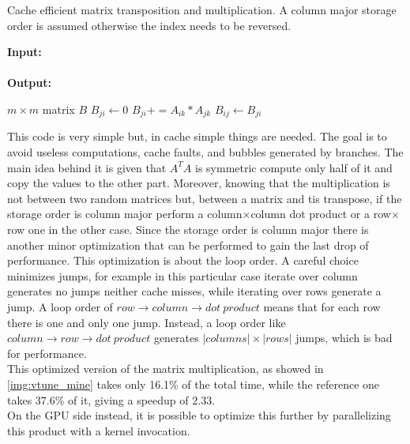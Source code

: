 \begin{algorithm}[h]
  \begin{flushleft}
    \caption{Cache efficient matrix transposition and multiplication. A column major storage order is assumed otherwise the index needs to be reversed.}
    \label{alg:transpose_multiply}
    \textbf{Input:} \\
    \hspace*{\algorithmicindent} \\
    \textbf{Output:} \\
    \hspace*{\algorithmicindent} 
  \end{flushleft}
  \begin{algorithmic}[1]
    \State $m \times m$ matrix $B$
         
        \State $B_{ji} \gets 0$
        \State $B_{ji}+=A_{ik}*A_{jk}$
        \EndFor
        \State $B_{ij} \gets B_{ji}$ 
        \EndFor
        \EndFor
        \EndFunction
      \end{algorithmic}
    \end{algorithm}
This code is very simple but, in cache simple things are needed. The goal is to avoid useless computations, cache faults, and bubbles generated by branches. The main idea behind it is given that $A^TA$ is symmetric compute only half of it and copy the values to the other part. Moreover, knowing that the multiplication is not between two random matrices but, between a matrix and tis transpose, if the storage order is column major perform a column$\times$column dot product or a row$\times$row one in the other case. Since the storage order is column major there is another minor optimization that can be performed to gain the last drop of performance. This optimization is about the loop order. A careful choice minimizes jumps, for example in this particular case iterate over column generates no jumps neither cache misses, while iterating over rows generate a jump. A loop order of $row \rightarrow column \rightarrow dot\ product$ means that for each row there is one and only one jump. Instead, a loop order like $column \rightarrow row \rightarrow dot\ product$ generates $|columns| \times |rows|$ jumps, which is bad for performance. \\
This optimized version of the matrix multiplication, as showed in \ref{img:vtune_mine} takes only 16.1\% of the total time, while the reference one takes 37.6\% of it, giving a speedup of $2.33$.\\
On the GPU side instead, it is possible to optimize this further by parallelizing this product with a kernel invocation. \\
